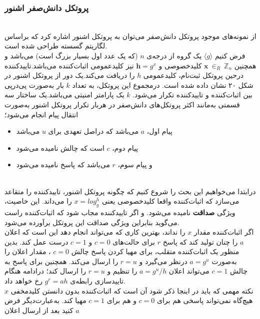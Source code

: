 \subsubsection{پروتکل دانش‌صفر اشنور}\label{schnore_zk_protocol}
\\
 از نمونه‌های موجود پروتکل دانش‌صفر می‌توان به پروتکل اشنور اشاره کرد که براساس  لگاریتم گسسته  طراحی شده است.
\\
فرض کنیم
$\langle g \rangle $
یک گروه از درجه‌ی 
$n$
(که یک عدد اول بسیار بزرگ است) می‌باشد و همچنین 
$\boldsymbol{x} ~{\in}_R ~\mathbb{Z}_n$
 کلیدخصوصی و 
$\boldsymbol{h} = g^x$
نیز کلیدعمومی اثبات‌کننده می‌باشد.تاییدکننده درحین پروتکل ثبت‌‌نام، کلیدعمومی 
$h$
را دریافت می‌کند.یک دور از پروتکل اشنور در شکل ۲۰ نشان داده شده است. درمجموع این پروتکل، به تعداد
$k$
بار به‌صورت پی‌در‌پی بین اثبات‌کننده و تاییدکننده تکرار می‌شود.
$k$
یک پارامتر امنیتی می‌باشد.یک ساختار سه قسمتی به‌مانند اکثر پروتکل‌های دانش‌صفر در هربار تکرار پروتکل اشنور به‌صورت انتقال پیام انجام می‌شود؛ 
\begin{itemize}
\item {
 پیام اول،
$a$
 می‌باشد که دراصل تعهدی برای 
$u$
می‌باشد
}
\item {
 پیام دوم، 
$c$
است که چالش نامیده می‌شود
}
\item {
و پیام سوم،  
$r$
می‌باشد که پاسخ نامیده می‌شود
}
\end{itemize}~
\label{soundness_property}
\\
درابتدا می‌خواهیم این بحث را شروع کنیم که چگونه پروتکل  اشنور، تاییدکننده را متقاعد می‌سازد که اثبات‌کننده واقعا کلیدخصوصی یعنی
$x = log_g^h$
را می‌داند.
 این خاصیت، ویژگی 
 \textbf{صداقت}
  نامیده می‌شود. و اگر تاییدکننده مجاب شود که اثبات‌کننده راست می‌گوید بنابراین ویژگی صداقت این پروتکل برآورده می‌شود.
\\
  اگر اثبات‌کننده مقدار
$x$
 را نداند، بهترین کاری که می‌تواند انجام دهد این است که اعلان
$a$
را چنان تولید کند که پاسخ
$r$
 برای حالت‌های 
$c=0$
و
$c=1$
درست عمل کند. بدین منظور یک اثبات‌کننده متقلب، برای مهیا کردن پاسخ چالش 
$c=0$
، مقدار اعلان را به‌صورت 
$a = g^u$
درنظر می‌گیرد و 
$r=u$
را ارسال می‌کند. همچنین برای پاسخ به چالش
$c=1$
 می‌تواند اعلان
$a = {g^u}/ h$
 را تنظیم و
$r=u$
 را ارسال کند؛ درادامه هنگام تاییدسازی رابطه‌ی
$g^r = ah$
 رخ خواهد داد.
\\ 
 نکته مهمی که باید در اینجا ذکر شود آن است که اثبات‌کننده بدون دانستن کلیدمخفی
$x$
  هیچ‌گاه نمی‌تواند پاسخی هم برای 
$c=0$
 و هم برای
$c=1$
مهیا کند. به‌عبارت‌دیگر فرض کنید بعد از ارسال اعلان
$a$
